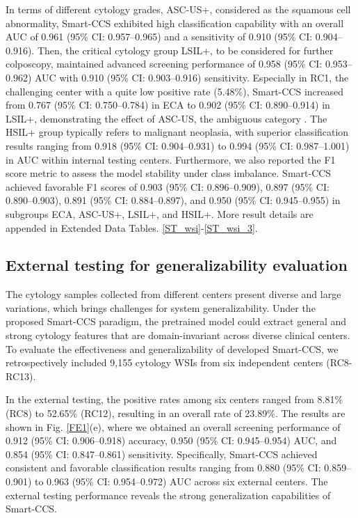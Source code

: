 In terms of different cytology grades, ASC-US+, considered as the squamous cell abnormality, Smart-CCS exhibited high classification capability with an overall AUC of 0.961 (95\% CI: 0.957–0.965) and a sensitivity of 0.910 (95\% CI: 0.904–0.916). Then, the critical cytology group LSIL+, to be considered for further colposcopy, maintained advanced screening performance of 0.958 (95\% CI: 0.953–0.962) AUC with 0.910 (95\% CI: 0.903–0.916) sensitivity. Especially in RC1, the challenging center with a quite low positive rate (5.48\%), Smart-CCS increased from 0.767 (95\% CI: 0.750–0.784) in ECA to 0.902 (95\% CI: 0.890–0.914) in LSIL+, demonstrating the effect of ASC-US, the ambiguous category \cite{jiang2024holistic, nayar2015bethesda}. The HSIL+ group typically refers to malignant neoplasia, with superior classification results ranging from 0.918 (95\% CI: 0.904–0.931) to 0.994 (95\% CI: 0.987–1.001) in AUC within internal testing centers. Furthermore, we also reported the F1 score metric to assess the model stability under class imbalance. Smart-CCS achieved favorable F1 scores of 0.903 (95\% CI: 0.896–0.909), 0.897 (95\% CI: 0.890–0.903), 0.891 (95\% CI: 0.884–0.897), and 0.950 (95\% CI: 0.945–0.955) in subgroups ECA, ASC-US+, LSIL+, and HSIL+. More result details are appended in Extended Data Tables. \ref{ST_wsi}-\ref{ST_wsi_3}.

\subsection*{External testing for generalizability evaluation}\label{subsec2-5}
The cytology samples collected from different centers present diverse and large variations, which brings challenges for system generalizability. Under the proposed Smart-CCS paradigm, the pretrained model could extract general and strong cytology features that are domain-invariant across diverse clinical centers.  To evaluate the effectiveness and generalizability of developed Smart-CCS, we retrospectively included 9,155 cytology WSIs from six independent centers (RC8-RC13).

In the external testing, the positive rates among six centers ranged from 8.81\% (RC8) to 52.65\% (RC12), resulting in an overall rate of 23.89\%. The results are shown in Fig. \ref{FE1}(e), where we obtained an overall screening performance of 0.912 (95\% CI: 0.906–0.918) accuracy, 0.950 (95\% CI: 0.945–0.954) AUC, and 0.854 (95\% CI: 0.847–0.861) sensitivity. Specifically, Smart-CCS achieved consistent and favorable classification results ranging from 0.880 (95\% CI: 0.859–0.901) to 0.963 (95\% CI: 0.954–0.972) AUC across six external centers.
The external testing performance reveals the strong generalization capabilities of Smart-CCS.


